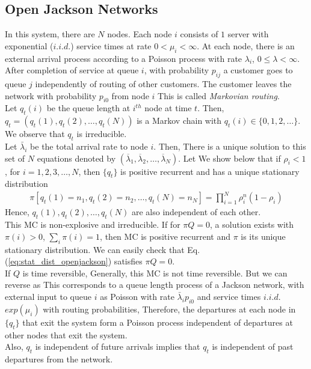 \documentclass[all-lectures.tex]{subfiles}
\begin{document}
\subsection{Open Jackson Networks}
In this system, there are $N$ nodes. Each node $i$ consists of $1$ server with exponential ($i.i.d.$) service times at rate $0 < \mu_i < \infty$. At each node, there is an external arrival process according to a Poisson process with rate $\lambda_i$, $0\leq \lambda <\infty$. After completion of service at queue $i$, with probability $p_{ij}$ a customer goes to queue $j$ independently of routing of other customers. The customer leaves the network with probability $p_{i0}$ from node $i$
This is called \textit{Markovian routing}. \\
\indent Let $q_t(i)$ be the queue length at $i^{th}$ node at time $t$. Then, $q_t = (q_t(1), q_t(2), \dots , q_t(N))$ is a Markov chain with $q_t(i) \in \{0,1,2, \dots\}$. We observe that $q_t$ is irreducible. \\
\indent Let $\bar{\lambda}_i$ be the total arrival rate to node $i$. Then,
There is a unique solution to this set of $N$ equations denoted by $(\overline{\lambda}_1,\overline{\lambda}_2,\dots,\overline{\lambda}_N)$. Let
We show below that if $\rho_i < 1$, for $i = 1,2,3, \dots , N$, then $\{q_t\}$ is positive recurrent and has a unique stationary distribution
\begin{align}\label{eq:stat_dist_openjackson}
\pi[q_t(1)=n_1, q_t(2)=n_2, \dots , q_t(N)=n_N] = \prod_{i=1}^{N} \rho^n_i (1-\rho_i)
\end{align}
Hence, $q_t(1), q_t(2), \dots , q_t(N)$ are also independent of each other. \\
\indent This MC is non-explosive and irreducible.
If for $\pi Q = 0 $, a solution exists with $\pi(i) >0$, $\sum_{i} \pi(i)= 1$, then MC is positive recurrent and $\pi$ is its unique stationary distribution. We can easily check that Eq. (\ref{eq:stat_dist_openjackson}) satisfies $\pi Q = 0$. \\
\indent If $Q$ is time reversible,
Generally, this MC is not time reversible. But we can reverse as
This corresponds to a queue length process of a Jackson network, with external input to queue $i$ as Poisson with rate $\bar{\lambda}_i p_{i0}$ and service times $i.i.d.$ $exp(\mu_i)$ with routing probabilities,
Therefore, the departures at each node in $\{q_t\}$ that exit the system form a Poisson process independent of departures at other nodes that exit the system. \\
\indent Also, $q_t$ is independent of future arrivals implies that $q_t$ is independent of past departures from the network.
\end{document}

